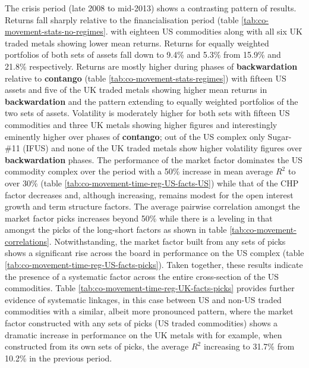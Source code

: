 \documentclass[]{elsarticle} %
\begin{document}
The crisis period (late 2008 to mid-2013) shows a contrasting pattern of results. Returns fall sharply relative to the financialisation period (table \ref{tab:co-movement-stats-no-regimes}. with eighteen US commodities along with all six UK traded metals showing lower mean returns. Returns for equally weighted portfolios of both sets of assets fall down to 9.4\% and 5.3\% from 15.9\% and 21.8\% respectively. Returns are mostly higher during phases of \textbf{backwardation} relative to \textbf{contango} (table \ref{tab:co-movement-stats-regimes}) with fifteen US assets and five of the UK traded metals showing higher mean returns in \textbf{backwardation} and the pattern extending to equally weighted portfolios of the two sets of assets. Volatility is moderately higher for both sets with fifteen US commodities and three UK metals showing higher figures and interestingly eminently higher over phases of \textbf{contango}; out of the US complex only Sugar-\#11 (IFUS) and none of the UK traded metals show higher volatility figures over \textbf{backwardation} phases. The performance of the market factor dominates the US commodity complex over the period with a 50\% increase in mean average \(R^{2}\) to over 30\% (table \ref{tab:co-movement-time-reg-US-facts-US}) while that of the CHP factor decreases and, although increasing, remains modest for the open interest growth and term structure factors. The average pairwise correlation amongst the market factor picks increases beyond 50\% while there is a leveling in that amongst the picks of the long-short factors as shown in table \ref{tab:co-movement-correlations}. Notwithstanding, the market factor built from any sets of picks shows a significant rise across the board in performance on the US complex (table \ref{tab:co-movement-time-reg-US-facts-picks}). Taken together, these results indicate the presence of a systematic factor across the entire cross-section of the US commodities. Table \ref{tab:co-movement-time-reg-UK-facts-picks} provides further evidence of systematic linkages, in this case between US and non-US traded commodities with a similar, albeit more pronounced pattern, where the market factor constructed with any sets of picks (US traded commodities) shows a dramatic increase in performance on the UK metals with for example, when constructed from its own sets of picks, the average \(R^{2}\) increasing to 31.7\% from 10.2\% in the previous period.\\
\end{document}
